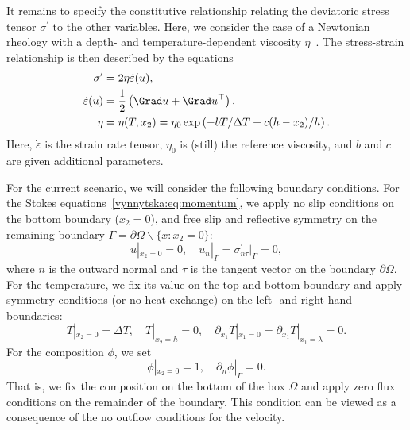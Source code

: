 It remains to specify the constitutive relationship relating the
deviatoric stress tensor $\sigma^{\prime}$ to the other
variables. Here, we consider the case of a Newtonian rheology with a
depth- and temperature-dependent viscosity
$\eta$~\citep{BlankenbachBusse1989}. The stress-strain relationship is
then described by the equations
\begin{align}
  \sigma^{\prime} &= 2 \eta \dot{\varepsilon} (u),
\\
  \dot{\varepsilon}(u) &= \frac{1}{2} \left (\Grad u + \Grad u^{\top} \right),
\\
  \eta &= \eta(T, x_2) = \eta_0 \exp \left( -b T/\Delta T + c (h - x_2)/ h \right) .
\end{align}
Here, $\dot {\varepsilon}$ is the strain rate tensor, $\eta_0$ is (still)
the reference viscosity, and $b$ and $c$ are given additional parameters.

For the current scenario, we will consider the following boundary
conditions. For the Stokes equations~\eqref{vynnytska:eq:momentum}, we
apply no slip conditions on the bottom boundary ($x_2 = 0$), and free
slip and reflective symmetry on the remaining boundary $\Gamma
= \partial \Omega \backslash \{x: x_2 = 0 \}$:
\begin{equation}
  \label{vynnytska:eq:bcs}
  u |_{x_2 = 0} = 0, \quad
  u_n|_{\Gamma}  =  \sigma^{\prime}_{n \tau} |_{\Gamma} = 0,
\end{equation}
where $n$ is the outward normal and $\tau$ is the tangent vector on
the boundary $\partial \Omega$. For the temperature, we fix its value
on the top and bottom boundary and apply symmetry conditions (or no
heat exchange) on the left- and right-hand boundaries:
\begin{equation}
  T |_{x_2 = 0} = \Delta T, \quad T |_{x_2 = h}  = 0, \quad
  \partial_{x_1} T |_{x_1 = 0}  = \partial_{x_1} T |_{x_1 = \lambda} = 0.
\end{equation}
For the composition $\phi$, we set
\begin{equation}
  \phi |_{x_2 = 0} = 1, \quad \partial_{n} \phi|_{\Gamma} = 0.
\end{equation}
That is, we fix the composition on the bottom of the box $\Omega$
and apply zero flux conditions on the remainder of the boundary. This
condition can be viewed as a consequence of the no outflow conditions
for the velocity.


